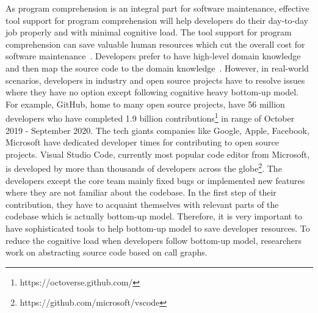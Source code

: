  As program comprehension is an integral part for software maintenance, effective tool support for program comprehension will help developers do their day-to-day job properly and with minimal cognitive load. The tool support for program comprehension can save valuable human resources which cut the overall cost for software maintenance~\cite{kruger2019features}. Developers prefer to have high-level domain knowledge and then map the source code to the domain knowledge~\cite{brooks1983theoryComprehensionPrograms}. However, in real-world scenarios, developers in industry and open source projects have to resolve issues where they have no option except following cognitive heavy bottom-up model. For example, GitHub, home to many open source projects, have 56 million developers who have completed 1.9 billion contributions\footnote{https://octoverse.github.com/} in range of October 2019 - September 2020. The tech giants companies like Google, Apple, Facebook, Microsoft have dedicated developer times for contributing to open source projects. Visual Studio Code, currently most popular code editor from Microsoft, is developed by more than thousands of developers across the globe\footnote{https://github.com/microsoft/vscode}. The developers except the core team mainly fixed bugs or implemented new features where they are not familiar about the codebase. In the first step of their contribution, they have to acquaint themselves with relevant parts of the codebase which is actually bottom-up model. Therefore, it is very important to have sophisticated tools to help bottom-up model to save developer resources. To reduce the cognitive load when developers follow bottom-up model, researchers work on abstracting source code based on call graphs. 


